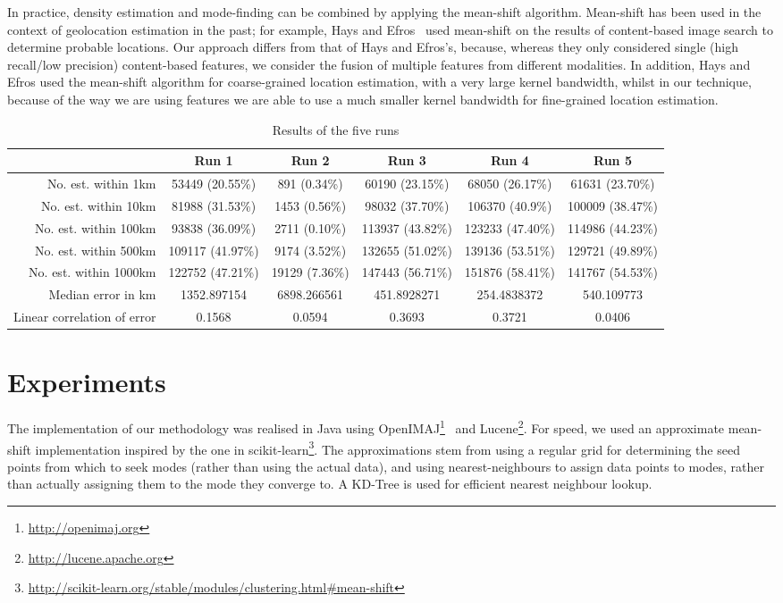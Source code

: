 \documentclass{../acm_proc_article-me11_tweaked}
\begin{document}
In practice, density estimation and mode-finding can be combined by applying the mean-shift algorithm. Mean-shift has been used in the context of geolocation estimation in the past; for example, Hays and Efros~\cite{Hays:2008:im2gps} used mean-shift on the results of content-based image search to determine probable locations. Our approach differs from that of Hays and Efros's, because, whereas they only considered single (high recall/low precision) content-based features, we consider the fusion of multiple features from different modalities. In addition, Hays and Efros used the mean-shift algorithm for coarse-grained location estimation, with a very large kernel bandwidth, whilst in our technique, because of the way we are using features we are able to use a much smaller kernel bandwidth for fine-grained location estimation.

\begin{table*}[ht!]
	\centering
	\caption{\label{tab:results}Results of the five runs}
	\begin{tabular}{|r||c|c|c|c|c|}
		\hline
		 & Run 1 & Run 2 & Run 3 & Run 4 & Run 5 \\ \hline \hline
		No. est. within 1km & 53449 (20.55\%) & 891 (0.34\%) & 60190 (23.15\%) & 68050 (26.17\%) & 61631 (23.70\%) \\ \hline
		No. est. within 10km & 81988 (31.53\%) & 1453 (0.56\%) & 98032 (37.70\%) & 106370 (40.9\%) & 100009 (38.47\%) \\ \hline
		No. est. within 100km & 93838 (36.09\%) & 2711 (0.10\%) & 113937 (43.82\%) & 123233 (47.40\%) & 114986 (44.23\%) \\ \hline
		No. est. within 500km & 109117 (41.97\%) & 9174 (3.52\%) & 132655 (51.02\%) & 139136 (53.51\%) & 129721 (49.89\%) \\ \hline
		No. est. within 1000km & 122752 (47.21\%) & 19129 (7.36\%) & 147443 (56.71\%) & 151876 (58.41\%) & 141767 (54.53\%) \\ \hline
		Median error in km & 1352.897154 & 6898.266561 & 451.8928271 & 254.4838372 & 540.109773 \\ \hline
		Linear correlation of error & 0.1568 & 0.0594 & 0.3693 & 0.3721 & 0.0406 \\ \hline
	\end{tabular}
\end{table*}

\section{Experiments}
The implementation of our methodology was realised in Java using OpenIMAJ\footnote{\url{http://openimaj.org}}~\cite{Hare:2011:OIJ:2072298.2072421} and Lucene\footnote{\url{http://lucene.apache.org}}. For speed, we used an approximate mean-shift implementation inspired by the one in scikit-learn\footnote{\url{http://scikit-learn.org/stable/modules/clustering.html#mean-shift}}. The approximations stem from using a regular grid for determining the seed points from which to seek modes (rather than using the actual data), and using nearest-neighbours to assign data points to modes, rather than actually assigning them to the mode they converge to. A KD-Tree is used for efficient nearest neighbour lookup.
\end{document}

